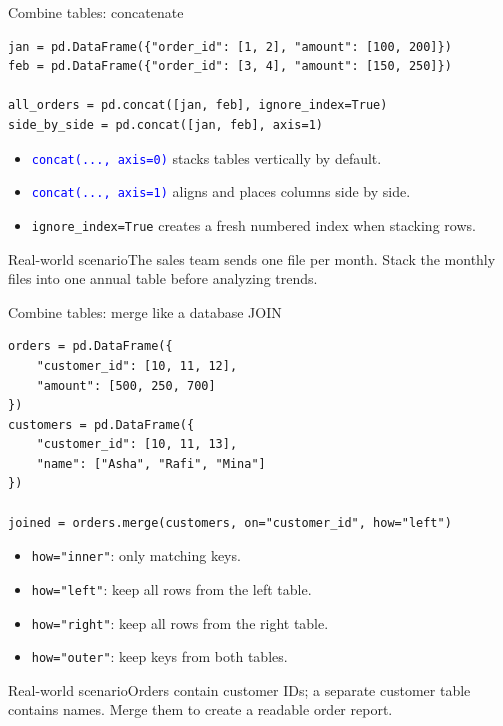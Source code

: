 \documentclass[aspectratio=169,10pt]{beamer}
\newcommand{\scenario}[1]{\begin{block}{Real-world scenario}#1\end{block}}
\newcommand{\method}[1]{\texttt{\textcolor{Blue}{#1}}}
\begin{document}
\begin{frame}[fragile]{Combine tables: concatenate}
\begin{lstlisting}
jan = pd.DataFrame({"order_id": [1, 2], "amount": [100, 200]})
feb = pd.DataFrame({"order_id": [3, 4], "amount": [150, 250]})

all_orders = pd.concat([jan, feb], ignore_index=True)
side_by_side = pd.concat([jan, feb], axis=1)
\end{lstlisting}
\begin{itemize}
\item \method{concat(..., axis=0)} stacks tables vertically by default.
\item \method{concat(..., axis=1)} aligns and places columns side by side.
\item \texttt{ignore\_index=True} creates a fresh numbered index when stacking rows.
\end{itemize}
\scenario{The sales team sends one file per month. Stack the monthly files into one annual table before analyzing trends.}
\end{frame}

\begin{frame}[fragile]{Combine tables: merge like a database JOIN}
\begin{lstlisting}
orders = pd.DataFrame({
    "customer_id": [10, 11, 12],
    "amount": [500, 250, 700]
})
customers = pd.DataFrame({
    "customer_id": [10, 11, 13],
    "name": ["Asha", "Rafi", "Mina"]
})

joined = orders.merge(customers, on="customer_id", how="left")
\end{lstlisting}
\begin{itemize}
\item \texttt{how="inner"}: only matching keys.
\item \texttt{how="left"}: keep all rows from the left table.
\item \texttt{how="right"}: keep all rows from the right table.
\item \texttt{how="outer"}: keep keys from both tables.
\end{itemize}
\scenario{Orders contain customer IDs; a separate customer table contains names. Merge them to create a readable order report.}
\end{frame}
\end{document}
